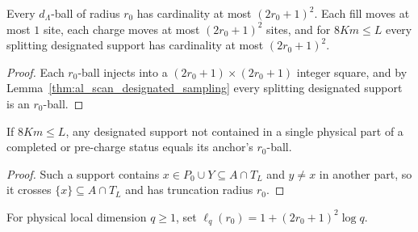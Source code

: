 \begin{lemma}
    \label{thm:al_scan_physical_subsystem_size}
    \leanok
    Every $d_\Lambda$-ball of radius $r_0$ has cardinality at most $(2r_0+1)^2$.
    Each fill moves at most $1$ site, each charge moves at most $(2r_0+1)^2$
    sites, and for $8Km\le L$ every splitting designated support has cardinality
    at most $(2r_0+1)^2$.
\end{lemma}
\begin{proof}\leanok
    Each $r_0$-ball injects into a $(2r_0+1)\times(2r_0+1)$ integer square, and
    by Lemma~\ref{thm:al_scan_designated_sampling} every splitting designated
    support is an $r_0$-ball.
\end{proof}

\begin{lemma}
    \label{thm:al_scan_noncontained_support_radius}
    \leanok
    If $8Km\le L$, any designated support not contained in a single physical
    part of a completed or pre-charge status equals its anchor's $r_0$-ball.
\end{lemma}
\begin{proof}\leanok
    Such a support contains $x\in P_0\cup Y\subseteq A\cap T_L$ and $y\ne x$ in
    another part, so it crosses $\{x\}\subseteq A\cap T_L$ and has truncation
    radius $r_0$.
\end{proof}

\begin{definition}
    \label{def:al_scan_physical_dimension_cap}
    \leanok
    For physical local dimension $q\ge1$, set
    $\ell_q(r_0)=1+(2r_0+1)^2\log q$.
\end{definition}

